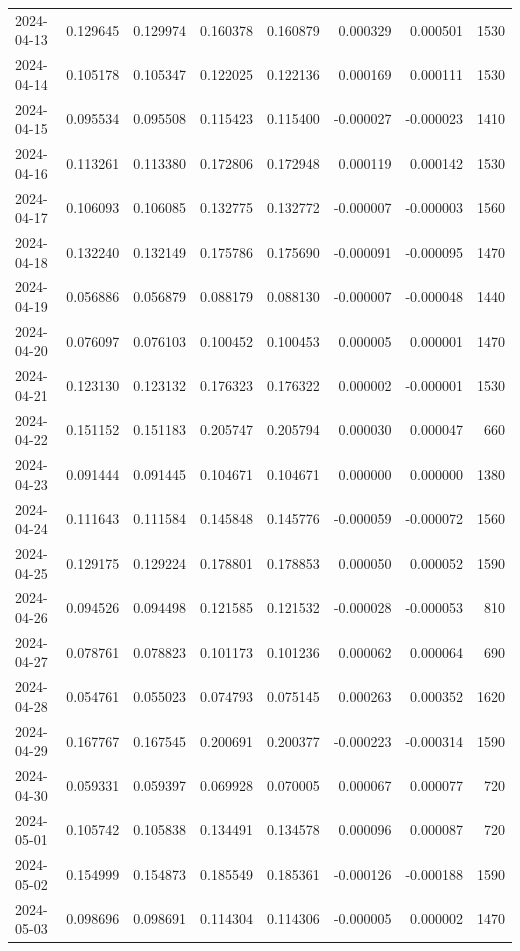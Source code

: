 \begin{tabular}{lrrrrrrr}
2024-04-13 & 0.129645 & 0.129974 & 0.160378 & 0.160879 & 0.000329 & 0.000501 & 1530 \\
2024-04-14 & 0.105178 & 0.105347 & 0.122025 & 0.122136 & 0.000169 & 0.000111 & 1530 \\
2024-04-15 & 0.095534 & 0.095508 & 0.115423 & 0.115400 & -0.000027 & -0.000023 & 1410 \\
2024-04-16 & 0.113261 & 0.113380 & 0.172806 & 0.172948 & 0.000119 & 0.000142 & 1530 \\
2024-04-17 & 0.106093 & 0.106085 & 0.132775 & 0.132772 & -0.000007 & -0.000003 & 1560 \\
2024-04-18 & 0.132240 & 0.132149 & 0.175786 & 0.175690 & -0.000091 & -0.000095 & 1470 \\
2024-04-19 & 0.056886 & 0.056879 & 0.088179 & 0.088130 & -0.000007 & -0.000048 & 1440 \\
2024-04-20 & 0.076097 & 0.076103 & 0.100452 & 0.100453 & 0.000005 & 0.000001 & 1470 \\
2024-04-21 & 0.123130 & 0.123132 & 0.176323 & 0.176322 & 0.000002 & -0.000001 & 1530 \\
2024-04-22 & 0.151152 & 0.151183 & 0.205747 & 0.205794 & 0.000030 & 0.000047 & 660 \\
2024-04-23 & 0.091444 & 0.091445 & 0.104671 & 0.104671 & 0.000000 & 0.000000 & 1380 \\
2024-04-24 & 0.111643 & 0.111584 & 0.145848 & 0.145776 & -0.000059 & -0.000072 & 1560 \\
2024-04-25 & 0.129175 & 0.129224 & 0.178801 & 0.178853 & 0.000050 & 0.000052 & 1590 \\
2024-04-26 & 0.094526 & 0.094498 & 0.121585 & 0.121532 & -0.000028 & -0.000053 & 810 \\
2024-04-27 & 0.078761 & 0.078823 & 0.101173 & 0.101236 & 0.000062 & 0.000064 & 690 \\
2024-04-28 & 0.054761 & 0.055023 & 0.074793 & 0.075145 & 0.000263 & 0.000352 & 1620 \\
2024-04-29 & 0.167767 & 0.167545 & 0.200691 & 0.200377 & -0.000223 & -0.000314 & 1590 \\
2024-04-30 & 0.059331 & 0.059397 & 0.069928 & 0.070005 & 0.000067 & 0.000077 & 720 \\
2024-05-01 & 0.105742 & 0.105838 & 0.134491 & 0.134578 & 0.000096 & 0.000087 & 720 \\
2024-05-02 & 0.154999 & 0.154873 & 0.185549 & 0.185361 & -0.000126 & -0.000188 & 1590 \\
2024-05-03 & 0.098696 & 0.098691 & 0.114304 & 0.114306 & -0.000005 & 0.000002 & 1470 \\

\end{tabular}
